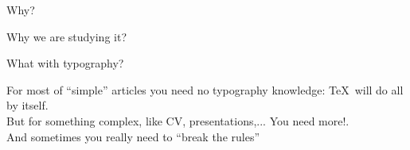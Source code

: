\graphicspath{{sec01/images/}{sec01/code/}}
\lstset{inputpath=sec01/code/}

\begin{frame}{Why?}

\Huge\centering Why we are studying it?
     
\end{frame}

\begin{frame}{What with typography?}\relax

For most of ``simple'' articles you need no typography knowledge: \TeX\ will do all by itself.\\[3ex]

But for something complex, like CV, presentations,... You need more!.\\[2ex]

And sometimes you really need to ``break the rules''

     
\end{frame}

